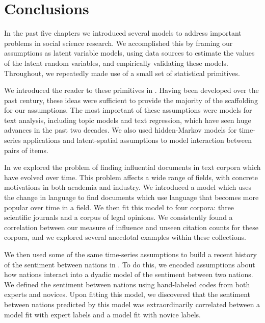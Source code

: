 \chapter{Conclusions}

In the past five chapters we introduced several models to address
important problems in social science research.  We accomplished this
by framing our assumptions as latent variable models, using data
sources to estimate the values of the latent random variables, and
empirically validating these models.  Throughout, we repeatedly made
use of a small set of statistical primitives.

 
We introduced the reader to these primitives in
.  Having been developed over the past
century, these ideas were sufficient to provide the majority of the
scaffolding for our assumptions.  The most important of these
assumptions were models for text analysis, including topic models and
text regression, which have seen huge advances in the past two
decades.  We also used hidden-Markov models for time-series applications
and latent-spatial assumptions to model interaction between pairs of items.

In  we explored the problem of finding influential
documents in text corpora which have evolved over time.  This problem
affects a wide range of fields, with concrete motivations in both
academia and industry.  We introduced a model which uses the change in
language to find documents which use language that becomes more
popular over time in a field.  We then fit this model to four corpora:
three scientific journals and a corpus of legal opinions. We
consistently found a correlation between our measure of influence and
unseen citation counts for these corpora, and we explored several
anecdotal examples within these collections.

We then used some of the same time-series assumptions to build a
recent history of the sentiment between nations in
.  To do this, we encoded assumptions about
how nations interact into a dyadic model of the sentiment between two
nations.  We defined the sentiment between nations using hand-labeled
codes from both experts and novices.  Upon fitting this model, we
discovered that the sentiment between nations predicted by this model
was extraordinarily correlated between a model fit with expert labels
and a model fit with novice labels.


